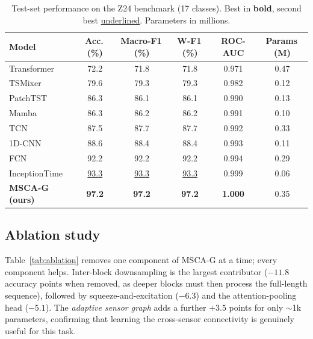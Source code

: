 \documentclass[11pt]{article}
\begin{document}
\begin{table}[t]
  \centering
  \caption{Test-set performance on the Z24 benchmark (\num{17} classes). Best in
  \textbf{bold}, second best \underline{underlined}. Parameters in millions.}
  \label{tab:main}
  \begin{tabular}{l S[table-format=2.1] S[table-format=2.1] S[table-format=2.1] S[table-format=1.3] S[table-format=1.2]}
    \toprule
    Model & {Acc.\,(\%)} & {Macro-F1\,(\%)} & {W-F1\,(\%)} & {ROC-AUC} & {Params\,(M)} \\
    \midrule
    Transformer    & 72.2 & 71.8 & 71.8 & 0.971 & 0.47 \\
    TSMixer        & 79.6 & 79.3 & 79.3 & 0.982 & 0.12 \\
    PatchTST       & 86.3 & 86.1 & 86.1 & 0.990 & 0.13 \\
    Mamba          & 86.3 & 86.2 & 86.2 & 0.991 & 0.10 \\
    TCN            & 87.5 & 87.7 & 87.7 & 0.992 & 0.33 \\
    1D-CNN         & 88.6 & 88.4 & 88.4 & 0.993 & 0.11 \\
    FCN            & 92.2 & 92.2 & 92.2 & 0.994 & 0.29 \\
    InceptionTime  & \underline{93.3} & \underline{93.3} & \underline{93.3} & 0.999 & 0.06 \\
    \midrule
    \textbf{MSCA-G (ours)} & \bfseries 97.2 & \bfseries 97.2 & \bfseries 97.2 & \bfseries 1.000 & 0.35 \\
    \bottomrule
  \end{tabular}
\end{table}

\subsection{Ablation study}
\label{sec:ablation}
Table~\ref{tab:ablation} removes one component of MSCA-G at a time; every
component helps. Inter-block downsampling is the largest contributor
($-11.8$ accuracy points when removed, as deeper blocks must then process the
full-length sequence), followed by squeeze-and-excitation ($-6.3$) and the
attention-pooling head ($-5.1$). The \emph{adaptive sensor graph} adds a further
$+3.5$ points for only $\sim$1k parameters, confirming that learning the
cross-sensor connectivity is genuinely useful for this task.
\end{document}
